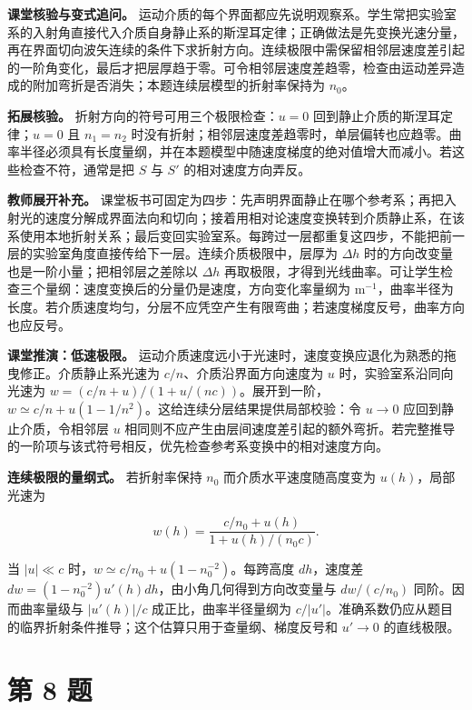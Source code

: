 \documentclass[12pt,a4paper,UTF8]{ctexart}
\begin{document}
\textbf{课堂核验与变式追问。}
运动介质的每个界面都应先说明观察系。学生常把实验室系的入射角直接代入介质自身静止系的斯涅耳定律；正确做法是先变换光速分量，再在界面切向波矢连续的条件下求折射方向。连续极限中需保留相邻层速度差引起的一阶角变化，最后才把层厚趋于零。可令相邻层速度差趋零，检查由运动差异造成的附加弯折是否消失；本题连续层模型的折射率保持为
\(n_0\)。

\textbf{拓展核验。} 折射方向的符号可用三个极限检查：\(u=0\)
回到静止介质的斯涅耳定律；\(u=0\) 且 \(n_1=n_2\)
时没有折射；相邻层速度差趋零时，单层偏转也应趋零。曲率半径必须具有长度量纲，并在本题模型中随速度梯度的绝对值增大而减小。若这些检查不符，通常是把
\(S\) 与 \(S'\) 的相对速度方向弄反。

\textbf{教师展开补充。}
课堂板书可固定为四步：先声明界面静止在哪个参考系；再把入射光的速度分解成界面法向和切向；接着用相对论速度变换转到介质静止系，在该系使用本地折射关系；最后变回实验室系。每跨过一层都重复这四步，不能把前一层的实验室角度直接传给下一层。连续介质极限中，层厚为
\(\Delta h\) 时的方向改变量也是一阶小量；把相邻层之差除以 \(\Delta h\)
再取极限，才得到光线曲率。可让学生检查三个量纲：速度变换后的分量仍是速度，方向变化率量纲为
\(\mathrm m^{-1}\)，曲率半径为长度。若介质速度均匀，分层不应凭空产生有限弯曲；若速度梯度反号，曲率方向也应反号。

\textbf{课堂推演：低速极限。}
运动介质速度远小于光速时，速度变换应退化为熟悉的拖曳修正。介质静止系光速为
\(c/n\)、介质沿界面方向速度为 \(u\) 时，实验室系沿同向光速为
\(w=(c/n+u)/(1+u/(nc))\)。展开到一阶，\(w\simeq c/n+u(1-1/n^2)\)。这给连续分层结果提供局部校验：令
\(u\to0\) 应回到静止介质，令相邻层 \(u\)
相同则不应产生由层间速度差引起的额外弯折。若完整推导的一阶项与该式符号相反，优先检查参考系变换中的相对速度方向。

\textbf{连续极限的量纲式。} 若折射率保持 \(n_0\)
而介质水平速度随高度变为 \(u(h)\)，局部光速为

\[
w(h)=\frac{c/n_0+u(h)}{1+u(h)/(n_0c)}.
\]

当 \(|u|\ll c\) 时，\(w\simeq c/n_0+u(1-n_0^{-2})\)。每跨高度
\(dh\)，速度差 \(dw=(1-n_0^{-2})u'(h)dh\)，由小角几何得到方向改变量与
\(dw/(c/n_0)\) 同阶。因而曲率量级与 \(|u'(h)|/c\) 成正比，曲率半径量纲为
\(c/|u'|\)。准确系数仍应从题目的临界折射条件推导；这个估算只用于查量纲、梯度反号和
\(u'\to0\) 的直线极限。

\newpage

\section{第 8 题}\label{ux7b2c-8-ux9898}
\end{document}
